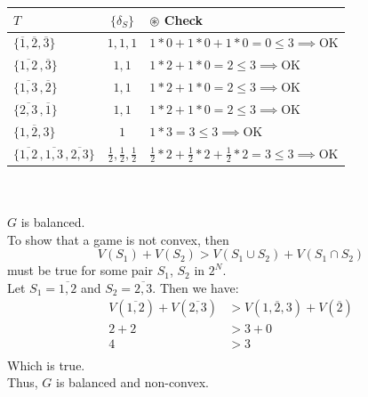 \documentclass{article}
\begin{document}
\begin{enumerate}
\begin{tabular}{| l | c | l |}
    \hline
    $T$                                                          &  $\{\delta_{S}\}$                         &  
    $\circledast$ Check \\
    \hline\hline
    $\{\overline{1}, \overline{2}, \overline{3}\}$               &  $1, 1, 1$                                &  
    $1 * 0 + 1 * 0 + 1 * 0 = 0 \le 3 \implies \text{OK}$ \\
    \hline
    $\{\overline{1, 2}\,, \overline{3}\}$                        &  $1, 1$                                   & 
    $1 * 2 + 1 * 0 = 2 \le 3 \implies \text{OK}$ \\
    \hline
    $\{\overline{1, 3}\,, \overline{2}\}$                        &  $1, 1$                                   & 
    $1 * 2 + 1 * 0 = 2 \le 3 \implies \text{OK}$ \\
    \hline
    $\{\overline{2, 3}\,, \overline{1}\}$                        &  $1, 1$                                   & 
    $1 * 2 + 1 * 0 = 2 \le 3 \implies \text{OK}$ \\
    \hline
    $\{\overline{1, 2, 3}\}$                                     &  $1$                                      & 
    $1 * 3 = 3 \le 3 \implies \text{OK}$ \\
    \hline
    $\{\overline{1, 2}\,, \overline{1, 3}\,, \overline{2, 3}\}$  &  $\frac{1}{2}, \frac{1}{2}, \frac{1}{2}$  & 
    $\frac{1}{2} * 2 + \frac{1}{2} * 2 + \frac{1}{2} * 2 = 3 \le 3 \implies \text{OK}$ \\
    \hline
\end{tabular} \\\\
$G$ is balanced. \\
To show that a game is not convex, then
\[ V(S_{1}) + V(S_{2}) > V(S_{1} \cup S_{2}) + V(S_{1} \cap S_{2}) \]
must be true for some pair $S_{1}$, $S_{2}$ in $2^{N}$. \\

Let $S_{1} = \overline{1, 2}$ and  $S_{2} = \overline{2, 3}$. Then we have:
\begin{align*}
V(\overline{1, 2}) + V(\overline{2, 3})  &>  V(\overline{1, 2, 3}) + V(\overline{2}) \\
2                  + 2                   &>  3                     + 0 \\
4                                        &>  3 \\ 
\end{align*}
Which is true. \\
Thus, $G$ is balanced and non-convex.


\end{enumerate}
\end{document}
